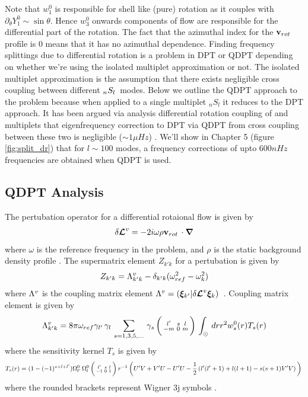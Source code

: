 Note that $w_1^0$ is responsible for shell like (pure) rotation as it couples with $\partial_{\theta} Y_1^0 \sim \sin\theta$. Hence $w_3^0$ onwards components of flow are responsible for the differential part of the rotation. The fact that the azimuthal index for the $\mathbf{v}_{rot}\,$ profile is $0$ means that it has no azimuthal dependence. Finding frequency splittings due to differential rotation is a problem in DPT or QDPT depending on whether we're using the isolated multiplet approximation or not. The isolated multiplet approximation is the assumption that there exists negligible cross coupling between different $_{n}S_{l}\,$ modes. 
Below we outline the QDPT approach to the problem because when applied to a single multiplet $_n S_l$ it reduces to the DPT approach. It has been argued via analysis differential rotation coupling of  and  multiplets that eigenfrequency correction to DPT via QDPT from cross coupling between these two is negligible ($\sim 1 \mu Hz$) \cite{lavely92}. We'll show in Chapter 5 (figure \ref{fig:split_dr}) that for $l\sim 100$ modes, a frequency corrections of upto $600 nHz$ frequencies are obtained when QDPT is used.


\subsection{QDPT Analysis}
The pertubation operator \dLd for a differential rotaional flow is given by 
\begin{equation}
\delta \bm{\mathcal{L}}^{v} = -2i \omega \rho \mathbf{v}_{rot}\, \cdot \bm{\nabla}
\end{equation}
where $\omega$ is the reference frequency in the problem, and $\rho$ is the static background density profile \cite{ritzwoller}.
The supermatrix element $Z_{k' k}$ for a pertubation \dLd is given by
\begin{equation}
Z_{k' k} = \Lambda^{v}_{k'k} - \delta_{k'k} (\omega_{ref}^2 - \omega_k^2)
\end{equation}
where $\Lambda^{v}$ is the coupling matrix element $\Lambda^{v} = (\bm{\xi}_{k'}|\delta \bm{\mathcal{L}}^{v} \bm{\xi}_{k})\,$ .
Coupling matrix element is given by
\begin{equation}
\Lambda^{v}_{k'k} = 8 \pi \omega_{ref} \gamma_{l'}\,\gamma_{l}\, \sum_{s=1,3,5,...}\, \gamma_{s}\, \bigg(\begin{smallmatrix} l' & s & l \\ -m & 0 & m \end{smallmatrix}\bigg)\, \int_{\odot} \, dr 
r^2 w_s^0(r) T_s(r)
\end{equation}
where the sensitivity kernel $T_s$ is given by
\begin{dmath}
T_s(r) = (1-(-1)^{s+l+l'}) \om{l'}{0} \om{l}{0} \wigred{-1}{0}{1} r^{-1}
 \enc{U'V+V'U-U'U-\frac{1}{2}\enc{l'(l'+1) + l(l+1) - s(s+1) V'V}}
\end{dmath}
where the rounded brackets represent Wigner 3j symbols \cite{ritzwoller}. 

